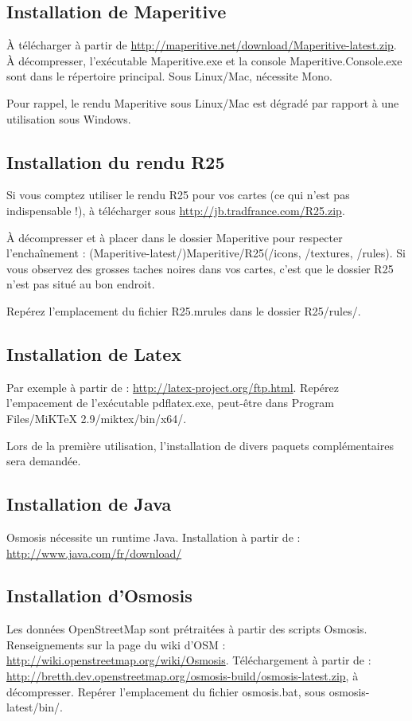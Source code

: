 \documentclass[12pt,french]{article}
\begin{document}
\subsection{Installation de Maperitive}
À télécharger à partir de \url{http://maperitive.net/download/Maperitive-latest.zip}. À décompresser, l'exécutable Maperitive.exe et la console Maperitive.Console.exe sont dans le répertoire principal. Sous Linux/Mac, nécessite Mono. \par
Pour rappel, le rendu Maperitive sous Linux/Mac est dégradé par rapport à une utilisation sous Windows.

\subsection{Installation du rendu R25}
\label{R25}
Si vous comptez utiliser le rendu R25 pour vos cartes (ce qui n'est pas indispensable !), à télécharger sous \url{http://jb.tradfrance.com/R25.zip}.\par
À décompresser et à placer dans le dossier Maperitive pour respecter l’enchaînement : (Maperitive-latest/)Maperitive/R25(/icons, /textures, /rules). Si vous observez des grosses taches noires dans vos cartes, c'est que le dossier R25 n'est pas situé au bon endroit.\par 
Repérez l'emplacement du fichier R25.mrules dans le dossier R25/rules/.

\subsection{Installation de Latex}
Par exemple à partir de : \url{http://latex-project.org/ftp.html}. Repérez l'empacement de l'exécutable pdflatex.exe, peut-être dans Program Files/MiKTeX 2.9/\linebreak[0]miktex/bin/x64/. \par
Lors de la première utilisation, l'installation de divers paquets complémentaires sera demandée.

\subsection{Installation de Java}
Osmosis nécessite un runtime Java. Installation à partir de : \url{http://www.java.com/fr/download/}

\subsection{Installation d'Osmosis}
Les données OpenStreetMap sont prétraitées à partir des scripts Osmosis. Renseignements sur la page du wiki d'OSM : \url{http://wiki.openstreetmap.org/wiki/Osmosis}. Téléchargement à partir de : \url{http://bretth.dev.openstreetmap.org/osmosis-build/osmosis-latest.zip}, à décompresser. Repérer l'emplacement du fichier osmosis.bat, sous osmosis-latest/bin/.
\end{document}
